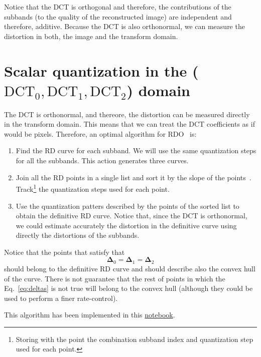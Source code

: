 Notice that the DCT is orthogonal and therefore, the contributions of
the subbands (to the quality of the reconstructed image) are
independent and therefore, additive. Because the DCT is also
orthonormal, we can measure the distortion in both, the image and the
transform domain.

\section{Scalar quantization in the ($\text{DCT}_0,\text{DCT}_1,\text{DCT}_2$) domain}

The DCT is orthonormal, and thereore, the distortion can be measured
directly in the transform domain. This means that we can treat the DCT
coefficients as if would be pixels. Therefore, an optimal algorithm
for RDO~\cite{vruiz__information_theory} is:

\begin{enumerate}
\item Find the RD curve for each subband. We will use the same
  quantization steps for all the subbands. This action generates three
  curves.
\item Join all the RD points in a single list and sort it by the slope
  of the
  points~\cite{vruiz__information_theory}. Track\footnote{Storing with
  the point the combination subband index and quantization step used
  for each point.} the quantization steps used for each point.
\item Use the quantization patters described by the points of the
  sorted list to obtain the definitive RD curve. Notice that, since
  the DCT is orthonormal, we could estimate accurately the distortion
  in the definitive curve using directly the distortions of the
  subbands.
\end{enumerate}

Notice that the points that satisfy that
\begin{equation}
  \mathbf{\Delta}_0 = \mathbf{\Delta}_1 = \mathbf{\Delta}_2
  \label{eq:deltas}
\end{equation}
should belong to the definitive RD curve and should describe also the
convex hull of the curve. There is not guarantee that the rest of
points in which the Eq.~\eqref{eq:deltas} is not true will belong to
the convex hull (although they could be used to perform a finer
rate-control).

This algorithm has been implemented in this \href{https://github.com/Sistemas-Multimedia/Sistemas-Multimedia.github.io/blob/master/contents/RGB_DCT/RGB_DCT.ipynb}{notebook}.

